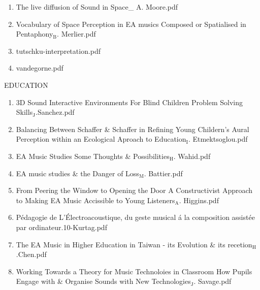 \documentclass[11pt]{article}
\begin{document}
\begin{enumerate}
\item The live diffusion of Sound in Space\_ A. Moore.pdf
\label{sec-1-1-1-1-49-1-8-29}

\item Vocabulary of Space Perception in EA musics Composed or Spatialised in Pentaphony$_{\text{B}}$. Merlier.pdf
\label{sec-1-1-1-1-49-1-8-30}

\item tutschku-interpretation.pdf
\label{sec-1-1-1-1-49-1-8-31}

\item vandegorne.pdf
\label{sec-1-1-1-1-49-1-8-32}
\end{enumerate}

\item EDUCATION
\label{sec-1-1-1-1-49-1-9}
\begin{enumerate}
\item 3D Sound Interactive Environments For Blind Children Problem Solving Skills$_{\text{J}}$.Sanchez.pdf
\label{sec-1-1-1-1-49-1-9-1}

\item Balancing Between Schaffer \& Schaffer in Refining Young Childern's Aural Perception within an Ecological Aproach to Education$_{\text{I}}$. Etmektsoglou.pdf
\label{sec-1-1-1-1-49-1-9-2}

\item EA Music Studies Some Thoughts \& Possibilities$_{\text{H}}$. Wahid.pdf
\label{sec-1-1-1-1-49-1-9-3}

\item EA music studies \& the Danger of Loss$_{\text{M}}$. Battier.pdf
\label{sec-1-1-1-1-49-1-9-4}

\item From Peering the Window to Opening the Door A Constructivist Approach to Making EA Music Accissible to Young Listeners$_{\text{A}}$. Higgins.pdf
\label{sec-1-1-1-1-49-1-9-5}

\item Pédagogie de L'Électroacoustique, du geste musical á la composition assistée par ordinateur.10-Kurtag.pdf
\label{sec-1-1-1-1-49-1-9-6}

\item The EA Music in Higher Education in Taiwan - its Evolution \& its recetion$_{\text{H}}$.Chen.pdf
\label{sec-1-1-1-1-49-1-9-7}

\item Working Towards a Theory for Music Technoloies in Classroom How Pupils Engage with \& Organise Sounds with New Technologies$_{\text{J}}$. Savage.pdf
\label{sec-1-1-1-1-49-1-9-8}
\end{enumerate}
\end{document}
